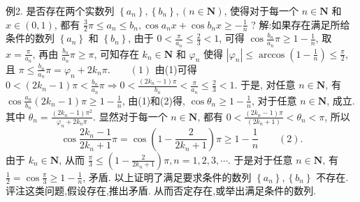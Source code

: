 例2. 是否存在两个实数列 $\left\{a_n\right\},\left\{b_n\right\},(n \in \mathbf{N})$, 使得对于每一个 $n \in \mathbf{N}$ 和 $x \in(0,1)$, 都有 $\frac{3}{2} \pi \leqslant a_n \leqslant b_n, \cos a_n x+\cos b_n x \geqslant-\frac{1}{n}$ ?
解:如果存在满足所给条件的数列 $\left\{a_n\right\}$ 和 $\left\{b_n\right\}$, 由于 $0<\frac{\pi}{a_n} \leqslant \frac{2}{3}<1$, 可得 $\cos \frac{b_n}{a_n} \pi \geqslant 1-\frac{1}{n}$, 取 $x=\frac{\pi}{a_n}$, 再由 $\frac{b_n}{a_n} \pi \geqslant \pi$, 可知存在 $k_n \in \mathbf{N}$ 和 $\varphi_n$ 使得
$\left|\varphi_n\right| \leqslant \arccos \left(1-\frac{1}{n}\right) \leqslant \frac{\pi}{2}$, 且 $\pi \leqslant \frac{b_n}{a_n} \pi=\varphi_n+2 k_n \pi. \quad\quad(1)$
由(1)可得 $0<\left(2 k_n-1\right) \pi<\frac{b_n}{a_n} \pi \Rightarrow 0<\frac{\left(2 k_n-1\right) \pi}{b_n}<\frac{\pi}{a_n} \leqslant \frac{2}{3}<1$.
于是, 对任意 $n \in \mathbf{N}$, 有 $\cos \frac{a_n}{b_n}\left(2 k_n-1\right) \pi \geqslant 1-\frac{1}{n}$,
由(1)和(2)得, $\cos \theta_n \geqslant 1-\frac{1}{n}$, 对于任意 $n \in \mathbf{N}$, 成立.
其中 $\theta_n=\frac{\left(2 k_n-1\right) \pi^2}{\varphi_n+2 k_n \pi}$.
显然对于每一个 $n \in \mathbf{N}$, 都有 $0<\frac{\left(2 k_n-1\right) \pi}{\left(2 k_n+1\right)}<\theta_n<\pi$, 所以
$$
\cos \frac{2 k_n-1}{2 k_n+1} \pi=\cos \left(1-\frac{2}{2 k_n+1}\right) \pi \geqslant 1-\frac{1}{n} \quad\quad(2).
$$
由于 $k_n \in \mathbf{N}$, 从而 $\frac{\pi}{3} \leqslant\left(1-\frac{2}{2 k_n+1}\right) \pi, n=1,2,3, \cdots$. 于是对于任意 $n \in \mathbf{N}$, 有 $\frac{1}{2}=\cos \frac{\pi}{3} \geqslant 1-\frac{1}{n}$, 矛盾.
以上证明了满足要求条件的数列 $\left\{a_n\right\},\left\{b_n\right\}$ 不存在.
评注这类问题,假设存在,推出矛盾.
从而否定存在,或举出满足条件的数列.



